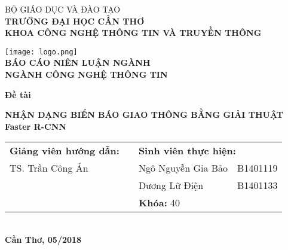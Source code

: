 \documentclass[../thesis.tex]{subfiles}
\begin{document}
\begin{titlepage}

\begin{center}

BỘ GIÁO DỤC VÀ ĐÀO TẠO\\
\textbf{TRƯỜNG ĐẠI HỌC CẦN THƠ\\}
\textbf{KHOA CÔNG NGHỆ THÔNG TIN VÀ TRUYỀN THÔNG\\[1cm]}

\texttt{[image: logo.png]}\\[1cm]

\textbf{BÁO CÁO NIÊN LUẬN NGÀNH\\}
\textbf{NGÀNH CÔNG NGHỆ THÔNG TIN\\[2cm]}

\begin{large}
\textbf{Đề tài\\[0.5cm]}
\end{large}
\textbf{{\LARGE NHẬN DẠNG BIỂN BÁO GIAO THÔNG BẰNG GIẢI THUẬT Faster R-CNN}}
\\[3.5cm]

\begin{tabular}{ l c l l }
	 \textbf{Giảng viên hướng dẫn:} & \hspace{2cm} & \multicolumn{2}{l}{\textbf{Sinh viên thực hiện:}}\\
	 TS. Trần Công Án & & Ngô Nguyễn Gia Bảo &
	 B1401119\\
	 & & Dương Lữ Điện & B1401133\\
	 & & \multicolumn{2}{l}{\textbf{Khóa:} 40}
\end{tabular}
\\[4cm]

\textbf{Cần Thơ, 05/2018}

\end{center}

\end{titlepage}
\end{document}
